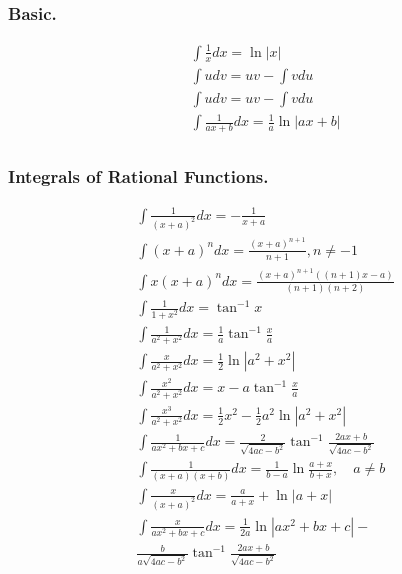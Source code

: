 \documentclass[../main.tex]{subfiles}
\begin{document}
\subsubsection*{Basic.}
\begin{align*}
    &\int \frac{1}{x}dx = \ln |x| \\
    &\int u dv = uv - \int v du    \\
    &\int u dv = uv - \int v du\\
    &\int \frac{1}{ax+b}dx = \frac{1}{a} \ln |ax + b| \\
\end{align*}

\subsubsection*{Integrals of Rational Functions.}
\begin{align*}
    &\int \frac{1}{(x+a)^2}dx = -\frac{1}{x+a}\\
    &\int (x+a)^n dx = \frac{(x+a)^{n+1}}{n+1}, n\ne -1\\
    &\int x(x+a)^n dx = \frac{(x+a)^{n+1} ( (n+1)x-a)}{(n+1)(n+2)}\\
    & \int \frac{1}{1+x^2}dx = \tan^{-1}x\\
    &\int \frac{1}{a^2+x^2}dx = \frac{1}{a}\tan^{-1}\frac{x}{a}\\
    &\int \frac{x}{a^2+x^2}dx = \frac{1}{2}\ln|a^2+x^2|\\
    &\int \frac{x^2}{a^2+x^2}dx = x-a\tan^{-1}\frac{x}{a}\\
    &\int \frac{x^3}{a^2+x^2}dx = \frac{1}{2}x^2-\frac{1}{2}a^2\ln|a^2+x^2|\\
    &\int \frac{1}{ax^2+bx+c}dx = \frac{2}{\sqrt{4ac-b^2}}\tan^{-1}\frac{2ax+b}{\sqrt{4ac-b^2}}\\
    &\int \frac{1}{(x+a)(x+b)}dx = \frac{1}{b-a}\ln\frac{a+x}{b+x}, \quad a\neq b\\
    &\int \frac{x}{(x+a)^2}dx = \frac{a}{a+x}+\ln |a+x|\\
    &\int \frac{x}{ax^2+bx+c}dx = \frac{1}{2a}\ln|ax^2+bx+c|-\\
    &\frac{b}{a\sqrt{4ac-b^2}}\tan^{-1}\frac{2ax+b}{\sqrt{4ac-b^2}}\\
\end{align*}
  
\end{document}
